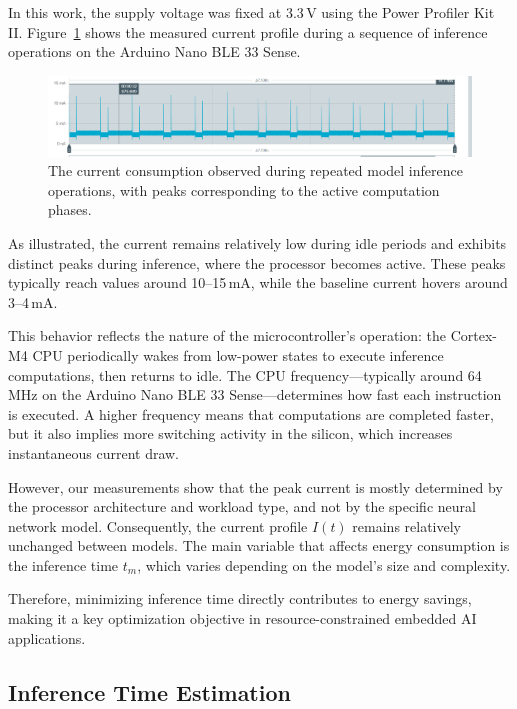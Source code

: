 In this work, the supply voltage was fixed at 3.3\,V using the Power Profiler Kit II. Figure~\ref{fig:current_profile} shows the measured current profile during a sequence of inference operations on the Arduino Nano BLE 33 Sense.

\begin{figure}[H]
    \centering
    \includegraphics[width=\textwidth]{Pictures/Current.png}
    \caption{The current consumption observed during repeated model inference operations, with peaks corresponding to the active computation phases.}
    \label{fig:current_profile}
\end{figure}

As illustrated, the current remains relatively low during idle periods and exhibits distinct peaks during inference, where the processor becomes active. These peaks typically reach values around 10–15\,mA, while the baseline current hovers around 3–4\,mA.

This behavior reflects the nature of the microcontroller's operation: the Cortex-M4 CPU periodically wakes from low-power states to execute inference computations, then returns to idle. The CPU frequency—typically around 64\,MHz on the Arduino Nano BLE 33 Sense—determines how fast each instruction is executed. A higher frequency means that computations are completed faster, but it also implies more switching activity in the silicon, which increases instantaneous current draw.

However, our measurements show that the peak current is mostly determined by the processor architecture and workload type, and not by the specific neural network model. Consequently, the current profile \( I(t) \) remains relatively unchanged between models. The main variable that affects energy consumption is the inference time \( t_m \), which varies depending on the model's size and complexity.

Therefore, minimizing inference time directly contributes to energy savings, making it a key optimization objective in resource-constrained embedded AI applications.



\subsection{Inference Time Estimation}

